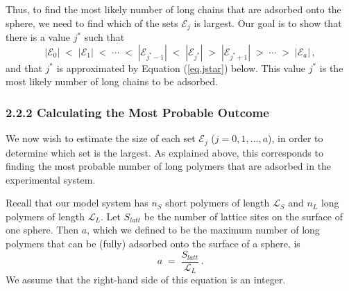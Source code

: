 \documentclass[journal=mamobx,manuscript=article]{achemso}
\newcommand{\leng}{\mathcal{L}}
\begin{document}
Thus, to find the most likely number of long chains %
that are adsorbed onto the sphere, we need to 
find which of the sets $\mathcal{E}_j$ is largest.
Our goal is to show that there is a value $j^*$
such that
\begin{equation}
    \label{eq.EEcomp}
  |\mathcal{E}_0| \;<\; |\mathcal{E}_1|\; < \; 
 \cdots\; < \; 
  |\mathcal{E}_{j^*-1}|\; < \;|\mathcal{E}_{j^*}|\; >
    \; |\mathcal{E}_{j^*+1}| \;>\; \cdots \; > \; |\mathcal{E}_a|\,,
\end{equation}
and that $j^*$ is approximated by Equation (\ref{eq.jstar}) below.  
This value $j^*$ is the most likely
number of long chains to be adsorbed.

\subsubsection{2.2.2 Calculating the Most Probable Outcome}   %
    \label{sec-calcMPO}

We now wish to estimate the size of each set $\mathcal{E}_j$ ($j=0,1,\ldots,a$), in order to  determine which set is the largest.  
As explained above, this corresponds to finding the most probable number of 
long polymers that are adsorbed in the experimental system. 

Recall that our model system has $n_S$ short 
polymers of length $\leng_S$ and $n_L$ long polymers
of length $\leng_L$.  
Let $S_{latt}$ be the number of lattice sites on 
the surface of one sphere.  Then $a$, which we
defined to be the maximum
number of long polymers that can be (fully)
adsorbed onto the surface of a sphere, is 
\begin{equation}
  \label{eq.aequal}
     a  \;=\;  \frac{S_{latt}}{\leng_L} \,.
\end{equation}
We assume that the right-hand side of this equation is an integer.  
\end{document}
